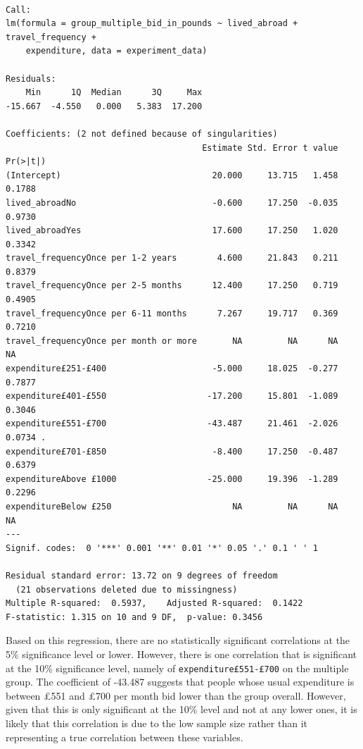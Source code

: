 \documentclass[
]{report}
\begin{document}
\begin{verbatim}

Call:
lm(formula = group_multiple_bid_in_pounds ~ lived_abroad + travel_frequency + 
    expenditure, data = experiment_data)

Residuals:
    Min      1Q  Median      3Q     Max 
-15.667  -4.550   0.000   5.383  17.200 

Coefficients: (2 not defined because of singularities)
                                       Estimate Std. Error t value Pr(>|t|)  
(Intercept)                              20.000     13.715   1.458   0.1788  
lived_abroadNo                           -0.600     17.250  -0.035   0.9730  
lived_abroadYes                          17.600     17.250   1.020   0.3342  
travel_frequencyOnce per 1-2 years        4.600     21.843   0.211   0.8379  
travel_frequencyOnce per 2-5 months      12.400     17.250   0.719   0.4905  
travel_frequencyOnce per 6-11 months      7.267     19.717   0.369   0.7210  
travel_frequencyOnce per month or more       NA         NA      NA       NA  
expenditure£251-£400                     -5.000     18.025  -0.277   0.7877  
expenditure£401-£550                    -17.200     15.801  -1.089   0.3046  
expenditure£551-£700                    -43.487     21.461  -2.026   0.0734 .
expenditure£701-£850                     -8.400     17.250  -0.487   0.6379  
expenditureAbove £1000                  -25.000     19.396  -1.289   0.2296  
expenditureBelow £250                        NA         NA      NA       NA  
---
Signif. codes:  0 '***' 0.001 '**' 0.01 '*' 0.05 '.' 0.1 ' ' 1

Residual standard error: 13.72 on 9 degrees of freedom
  (21 observations deleted due to missingness)
Multiple R-squared:  0.5937,    Adjusted R-squared:  0.1422 
F-statistic: 1.315 on 10 and 9 DF,  p-value: 0.3456
\end{verbatim}

Based on this regression, there are no statistically significant
correlations at the 5\% significance level or lower. However, there is
one correlation that is significant at the 10\% significance level,
namely of \texttt{expenditure£551-£700} on the multiple group. The
coefficient of -43.487 suggests that people whose usual expenditure is
between £551 and £700 per month bid lower than the group overall.
However, given that this is only significant at the 10\% level and not
at any lower ones, it is likely that this correlation is due to the low
sample size rather than it representing a true correlation between these
variables.
\end{document}
